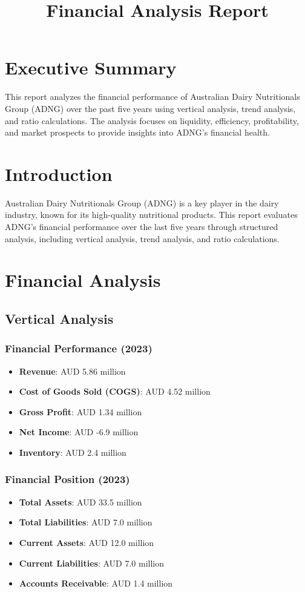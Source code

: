 \documentclass{article}
\title{Financial Analysis Report}
\author{}
\date{}
\begin{document}
\maketitle

\tableofcontents

\section*{Executive Summary}
This report analyzes the financial performance of Australian Dairy Nutritionals Group (ADNG) over the past five years using vertical analysis, trend analysis, and ratio calculations. The analysis focuses on liquidity, efficiency, profitability, and market prospects to provide insights into ADNG's financial health.

\section{Introduction}
Australian Dairy Nutritionals Group (ADNG) is a key player in the dairy industry, known for its high-quality nutritional products. This report evaluates ADNG's financial performance over the last five years through structured analysis, including vertical analysis, trend analysis, and ratio calculations.

\section{Financial Analysis}

\subsection{Vertical Analysis}
\subsubsection{Financial Performance (2023)}
\begin{itemize}
    \item \textbf{Revenue}: AUD 5.86 million
    \item \textbf{Cost of Goods Sold (COGS)}: AUD 4.52 million
    \item \textbf{Gross Profit}: AUD 1.34 million
    \item \textbf{Net Income}: AUD -6.9 million
    \item \textbf{Inventory}: AUD 2.4 million
\end{itemize}

\subsubsection{Financial Position (2023)}
\begin{itemize}
    \item \textbf{Total Assets}: AUD 33.5 million
    \item \textbf{Total Liabilities}: AUD 7.0 million
    \item \textbf{Current Assets}: AUD 12.0 million
    \item \textbf{Current Liabilities}: AUD 7.0 million
    \item \textbf{Accounts Receivable}: AUD 1.4 million
\end{itemize}
\end{document}
